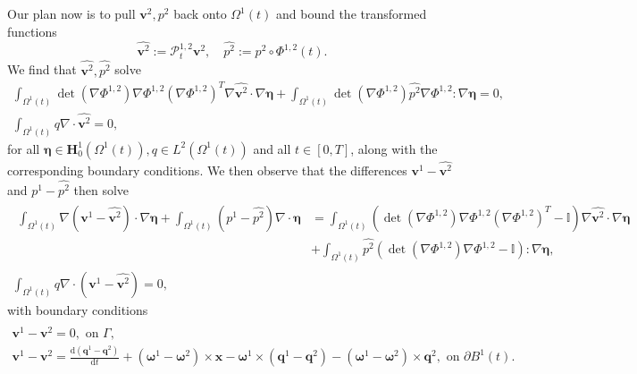 \documentclass[a4paper]{amsart}
\numberwithin{equation}{section}
\newcommand{\grad}{\nabla}
\newcommand{\Div}{\nabla \cdot}
\theoremstyle{plain}
\newcommand{\mbf}[1]{\mathbf{#1}}
\newcommand{\mbb}[1]{\mathbb{#1}}
\begin{document}
Our plan now is to pull $\mbf{v}^2, p^2$ back onto $\Omega^1(t)$ and bound the transformed functions
\[ \widehat{\mbf{v}^2} := \mathcal{P}^{1,2}_t \mbf{v}^2, \quad \widehat{p^2} := p^2 \circ \Phi^{1,2}(t). \]
We find that $\widehat{\mbf{v}^2}, \widehat{p^2}$ solve
\begin{gather*}
    \int_{\Omega^1(t)} \det(\grad \Phi^{1,2}) \grad \Phi^{1,2} (\grad \Phi^{1,2})^T \grad \widehat{\mbf{v}^2} \cdot \grad \boldsymbol{\eta} + \int_{\Omega^1(t)} \det(\grad \Phi^{1,2}) \widehat{p^2} \grad \Phi^{1,2} : \grad \boldsymbol{\eta} = 0,\\
    \int_{\Omega^1(t)} q \Div \widehat{\mbf{v}^2} = 0,
\end{gather*}
for all $\boldsymbol{\eta} \in \mbf{H}^1_0(\Omega^1(t)), q \in L^2(\Omega^1(t))$ and all $t \in [0,T]$, along with the corresponding boundary conditions.
We then observe that the differences $\mbf{v}^1 - \widehat{\mbf{v}^2}$ and $p^1 - \widehat{p^2}$ then solve
\begin{gather*}
\begin{aligned}
    \int_{\Omega^1(t)} \grad (\mbf{v}^1 - \widehat{\mbf{v}^2}) \cdot \grad \boldsymbol{\eta} + \int_{\Omega^1(t)} (p^1 -  \widehat{p^2}) \Div \boldsymbol{\eta} &= \int_{\Omega^1(t)} \left( \det(\grad \Phi^{1,2}) \grad \Phi^{1,2} (\grad \Phi^{1,2})^T - \mbb{I} \right) \grad \widehat{\mbf{v}^2} \cdot \grad \boldsymbol{\eta}\\
    &+ \int_{\Omega^1(t)} \widehat{p^2} \left(\det(\grad \Phi^{1,2})  \grad \Phi^{1,2} - \mbb{I} \right): \grad \boldsymbol{\eta},
    \end{aligned}\\
    \int_{\Omega^1(t)} q \Div (\mbf{v}^1 - \widehat{\mbf{v}^2}) = 0,
\end{gather*}
with boundary conditions
\begin{gather*}
    \mbf{v}^1 - \widehat{\mbf{v}^2} = 0, \text{ on } \Gamma,\\
    \mbf{v}^1 - \widehat{\mbf{v}^2} = \frac{\mathrm{d}(\mbf{q}^1-\mbf{q}^2)}{\mathrm{d}t} + (\boldsymbol{\omega}^1 - \boldsymbol{\omega}^2)\times \mbf{x} - \boldsymbol{\omega}^1 \times (\mbf{q}^1 - \mbf{q}^2) - (\boldsymbol{\omega}^1 - \boldsymbol{\omega}^2)\times \mbf{q}^2, \text{ on } \partial B^1(t).
\end{gather*}
\end{document}
